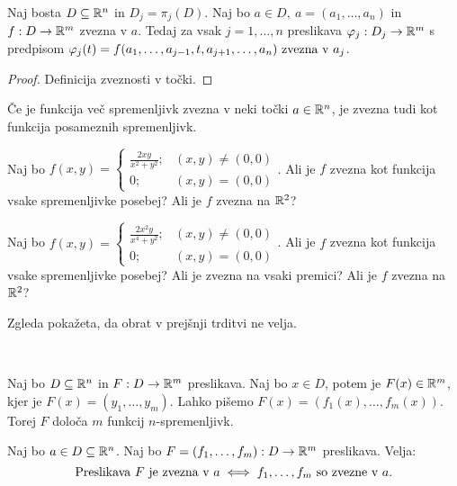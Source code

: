 \begin{trditev}
    Naj bosta $D \subseteq \mathbb{R}^n$ in $D_j = \pi_j(D)$. Naj bo $a \in D, \ a =(a_1, \ldots, a_n)$ in $f: D \to \mathbb{R}^m$ zvezna v $a$. Tedaj za vsak $j = 1, \ldots, n$ preslikava \(\varphi_j: D_j \to \mathbb{R}^m\) s predpisom \(\varphi_j(t) = f(a_1, \ldots, a_{j-1}, t, a_{j+1}, \ldots, a_n)$ zvezna v $a_j\).
\end{trditev}

\begin{proof}
    Definicija zveznosti v točki.
\end{proof}

\begin{opomba}
    Če je funkcija več spremenljivk zvezna v neki točki $a \in \mathbb{R}^n$, je zvezna tudi kot funkcija posameznih spremenljivk.
\end{opomba}

\begin{zgled}
    Naj bo $f(x,y) = \begin{cases}
        \frac{2xy}{x^2+y^2}; &(x,y) \neq (0,0) \\
        0; &(x,y) = (0,0)
    \end{cases}$. Ali je $f$ zvezna kot funkcija vsake spremenljivke posebej? Ali je $f$ zvezna na $\mathbb{R}^2$?
\end{zgled}

\begin{zgled}
    Naj bo $f(x,y) = \begin{cases}
        \frac{2x^2y}{x^4+y^2}; &(x,y) \neq (0,0) \\
        0; &(x,y) = (0,0)
    \end{cases}$. Ali je $f$ zvezna kot funkcija vsake spremenljivke posebej? Ali je zvezna na vsaki premici? Ali je $f$ zvezna na $\mathbb{R}^2$?
\end{zgled}

\begin{opomba}
    Zgleda pokažeta, da obrat v prejšnji trditvi ne velja.
\end{opomba}

\ 

Naj bo $D \subseteq \mathbb{R}^n$ in $F: D \to \mathbb{R}^m$ preslikava. Naj bo $x \in D$, potem je  $F(x) \in \mathbb{R}^m$, kjer je $F(x) = (y_1, \ldots, y_m)$.
Lahko pišemo $F(x) = (f_1(x), \ldots, f_m(x))$. Torej $F$ določa $m$ funkcij $n$-spremenljivk.

\begin{trditev}
    Naj bo $a \in D \subseteq \mathbb{R}^n$. Naj bo $F=(f_1, \ldots, f_m): D \to \mathbb{R}^m$ preslikava. Velja:
    $$\text{Preslikava } F \text{ je zvezna v } a \iff f_1,\ldots, f_m \text{ so zvezne v } a.$$
\end{trditev}


